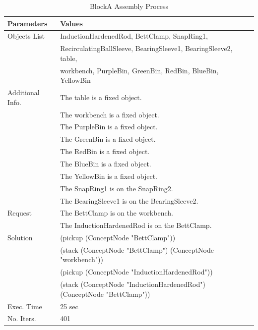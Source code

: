 \begin{table}[!htbp]
  \centering
  \caption{BlockA Assembly Process}\label{tab:ass_A_1}
  \medskip
\renewcommand\arraystretch{1}
\renewcommand\tabcolsep{5pt}
\begin{tabular}{ll}
\toprule
\textbf{Parameters} &  \textbf{Values}  \\
\midrule
\rowcolor{gray!25}
Objects List &  InductionHardenedRod, BettClamp, SnapRing1, \\
\rowcolor{gray!25}
& RecirculatingBallSleeve, BearingSleeve1, BearingSleeve2, table, \\
\rowcolor{gray!25}
& workbench, PurpleBin, GreenBin, RedBin, BlueBin, YellowBin \\
Additional Info. & The table is a fixed object. \\
& The workbench is a fixed object. \\
& The PurpleBin is a fixed object. \\
& The GreenBin is a fixed object. \\
& The RedBin is a fixed object. \\
& The BlueBin is a fixed object. \\
& The YellowBin is a fixed object. \\
& The SnapRing1 is on the SnapRing2. \\
& The BearingSleeve1 is on the BearingSleeve2. \\
\rowcolor{gray!25}
Request & The BettClamp is on the workbench. \\
\rowcolor{gray!25}
& The InductionHardenedRod is on the BettClamp. \\
Solution & (pickup (ConceptNode "BettClamp")) \\
& (stack (ConceptNode "BettClamp") (ConceptNode "workbench")) \\
& (pickup (ConceptNode "InductionHardenedRod")) \\
& (stack (ConceptNode "InductionHardenedRod") (ConceptNode "BettClamp")) \\
\rowcolor{gray!25}
Exec. Time & 25 sec \\
No. Iters. & 401 \\	
\bottomrule
\end{tabular}
\end{table}

